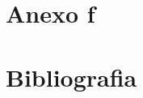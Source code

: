 \documentclass[oneside,11pt]{Latex/Classes/PhDthesisPSnPDF}
\begin{document}
\chapter{Anexo f}

\chapter{Bibliografia}

\renewcommand{\bibname}{Lista de Referencias}
 
 

\end{document}
